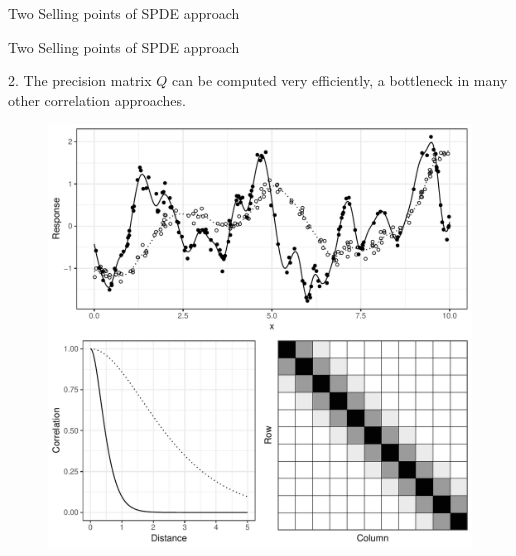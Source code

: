 \documentclass{beamer}
\begin{document}
\begin{frame}{Two Selling points of SPDE approach}
\begin{figure}[h]
\begin{figure}[h]
\begin{center}
    \end{center}
  \end{figure}
  \end{figure}

\end{frame}

\begin{frame}{Two Selling points of SPDE approach} 

2. The precision matrix $Q$ can be computed very efficiently, a bottleneck in many other correlation approaches.

  \begin{figure}[h]
    \begin{center}
      \includegraphics[height=0.7\textheight]{figures/smooth_corr.pdf}
    \end{center}
  \end{figure}

\end{frame}
\end{document}
